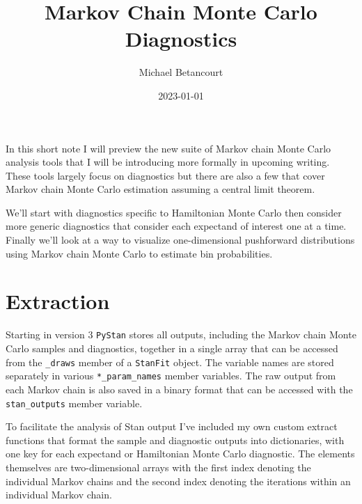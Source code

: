 \documentclass[
  letterpaper,
  DIV=11,
  numbers=noendperiod]{scrartcl}
\title{Markov Chain Monte Carlo Diagnostics}
\author{Michael Betancourt}
\date{2023-01-01}
\renewcommand*\contentsname{Table of contents}
\newcommand\contentsname{Table of contents}
\begin{document}
\maketitle
\ifdefined\Shaded\renewenvironment{Shaded}{\begin{tcolorbox}[frame hidden, sharp corners, borderline west={3pt}{0pt}{shadecolor}, enhanced, breakable, interior hidden, boxrule=0pt]}{\end{tcolorbox}}\fi

\renewcommand*\contentsname{Table of contents}
{
\hypersetup{linkcolor=}
\setcounter{tocdepth}{3}
\tableofcontents
}
In this short note I will preview the new suite of Markov chain Monte
Carlo analysis tools that I will be introducing more formally in
upcoming writing. These tools largely focus on diagnostics but there are
also a few that cover Markov chain Monte Carlo estimation assuming a
central limit theorem.

We'll start with diagnostics specific to Hamiltonian Monte Carlo then
consider more generic diagnostics that consider each expectand of
interest one at a time. Finally we'll look at a way to visualize
one-dimensional pushforward distributions using Markov chain Monte Carlo
to estimate bin probabilities.

\hypertarget{extraction}{%
\section{Extraction}\label{extraction}}

Starting in version 3 \texttt{PyStan} stores all outputs, including the
Markov chain Monte Carlo samples and diagnostics, together in a single
array that can be accessed from the \texttt{\_draws} member of a
\texttt{StanFit} object. The variable names are stored separately in
various \texttt{*\_param\_names} member variables. The raw output from
each Markov chain is also saved in a binary format that can be accessed
with the \texttt{stan\_outputs} member variable.

To facilitate the analysis of Stan output I've included my own custom
extract functions that format the sample and diagnostic outputs into
dictionaries, with one key for each expectand or Hamiltonian Monte Carlo
diagnostic. The elements themselves are two-dimensional arrays with the
first index denoting the individual Markov chains and the second index
denoting the iterations within an individual Markov chain.
\end{document}
